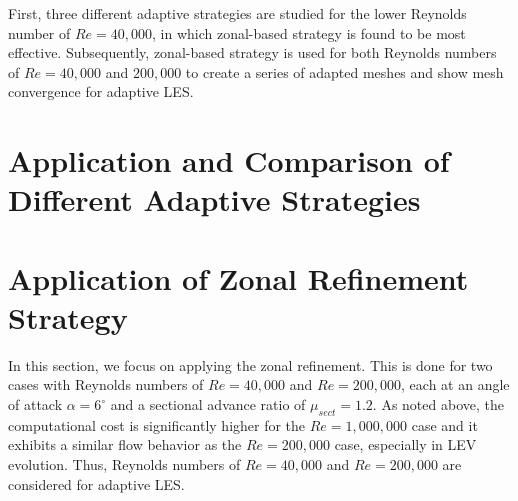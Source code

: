 First, three different adaptive strategies are studied for the lower Reynolds number of $Re=40,000$, in which zonal-based strategy is found to be most effective. Subsequently, zonal-based strategy is used for both Reynolds numbers of $Re=40,000$ and $200,000$ to create a series of adapted meshes and show mesh convergence for adaptive LES.


\section{Application and Comparison of Different Adaptive Strategies}
\label{sec:adaptive_strategy_comparison}




\section{Application of Zonal Refinement Strategy}


In this section, we focus on applying the zonal refinement. This is done for two cases with Reynolds numbers of $Re=40,000$ and $Re=200,000$, each at an angle of attack $\alpha=6^\circ$ and a sectional advance ratio of $\mu_{sect}=1.2$. As noted above, the computational cost is significantly higher for the $Re=1,000,000$ case and it exhibits a similar flow behavior as the $Re=200,000$ case, especially in LEV evolution. Thus, Reynolds numbers of $Re=40,000$ and $Re=200,000$ are considered for adaptive LES.

